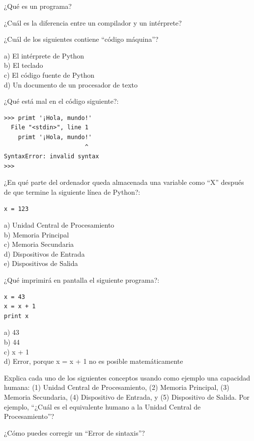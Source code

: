 \begin{ex}
¿Qué es un programa?
\end{ex}

\begin{ex}
¿Cuál es la diferencia entre un compilador y un intérprete?
\end{ex}

\begin{ex}
¿Cuál de los siguientes contiene ``código máquina''?

a) El intérprete de Python\\
b) El teclado\\
c) El código fuente de Python\\
d) Un documento de un procesador de texto
\end{ex}

\begin{ex}
¿Qué está mal en el código siguiente?:

\beforeverb
\begin{verbatim}
>>> primt '¡Hola, mundo!'
  File "<stdin>", line 1
    primt '¡Hola, mundo!'
                       ^
SyntaxError: invalid syntax
>>> 
\end{verbatim}
\afterverb

\end{ex}

\begin{ex}
¿En qué parte del ordenador queda almacenada una variable como ``X''
después de que termine la siguiente línea de Python?:

\beforeverb
\begin{verbatim}
x = 123
\end{verbatim}
\afterverb
%
a) Unidad Central de Procesamiento\\
b) Memoria Principal\\
c) Memoria Secundaria\\
d) Dispositivos de Entrada\\
e) Dispositivos de Salida
\end{ex}

\begin{ex}
¿Qué imprimirá en pantalla el siguiente programa?:

\beforeverb
\begin{verbatim}
x = 43
x = x + 1
print x
\end{verbatim}
\afterverb
%
a) 43\\
b) 44\\
c) x + 1\\
d) Error, porque x = x + 1 no es posible matemáticamente
\end{ex}

\begin{ex}
Explica cada uno de los siguientes conceptos usando como ejemplo una capacidad humana:
(1) Unidad Central de Procesamiento, (2) Memoria Principal, (3) Memoria Secundaria, 
(4) Dispositivo de Entrada, y
(5) Dispositivo de Salida.
Por ejemplo, ``¿Cuál es el equivalente humano a la Unidad Central de Procesamiento''? 
\end{ex}

\begin{ex}
¿Cómo puedes corregir un ``Error de sintaxis''?
\end{ex}

